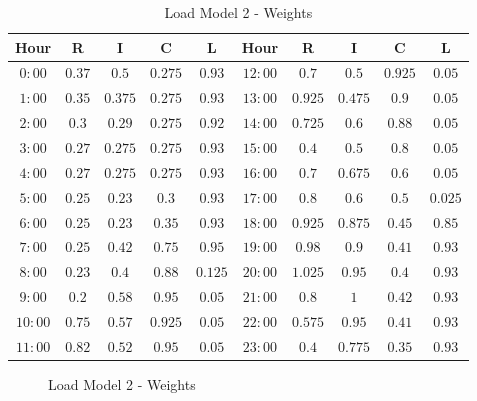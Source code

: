\begin{table}[H]
\centering
\begin{tabular}{ccccc|ccccc}
\rowcolor{gray!25}
\textbf{Hour} & \textbf{R} & \textbf{I} & \textbf{C} & \textbf{L} & \textbf{Hour} & \textbf{R} & \textbf{I} & \textbf{C} & \textbf{L}\\
\hline
$0:00$ & $0.37$ & $0.5$ & $0.275$ & $0.93$ & $12:00$ & $0.7$ & $0.5$ & $0.925$ & $0.05$\\
\rowcolor{gray!15}
$1:00$ & $0.35$ & $0.375$ & $0.275$ & $0.93$ & $13:00$ & $0.925$ & $0.475$ & $0.9$ & $0.05$\\
$2:00$ & $0.3$ & $0.29$ & $0.275$ & $0.92$ & $14:00$ & $0.725$ & $0.6$ & $0.88$ & $0.05$\\
\rowcolor{gray!15}
$3:00$ & $0.27$ & $0.275$ & $0.275$ & $0.93$ & $15:00$ & $0.4$ & $0.5$ & $0.8$ & $0.05$\\
$4:00$ & $0.27$ & $0.275$ & $0.275$ & $0.93$ & $16:00$ & $0.7$ & $0.675$ & $0.6$ & $0.05$\\
\rowcolor{gray!15}
$5:00$ & $0.25$ & $0.23$ & $0.3$ & $0.93$ & $17:00$ & $0.8$ & $0.6$ & $0.5$ & $0.025$\\
$6:00$ & $0.25$ & $0.23$ & $0.35$ & $0.93$ & $18:00$ & $0.925$ & $0.875$ & $0.45$ & $0.85$\\
\rowcolor{gray!15}
$7:00$ & $0.25$ & $0.42$ & $0.75$ & $0.95$ & $19:00$ & $0.98$ & $0.9$ & $0.41$ & $0.93$\\
$8:00$ & $0.23$ & $0.4$ & $0.88$ & $0.125$ & $20:00$ & $1.025$ & $0.95$ & $0.4$ & $0.93$\\
\rowcolor{gray!15}
$9:00$ & $0.2$ & $0.58$ & $0.95$ & $0.05$ & $21:00$ & $0.8$ & $1$ & $0.42$ & $0.93$\\
$10:00$ & $0.75$ & $0.57$ & $0.925$ & $0.05$ & $22:00$ & $0.575$ & $0.95$ & $0.41$ & $0.93$\\
\rowcolor{gray!15}
$11:00$ & $0.82$ & $0.52$ & $0.95$ & $0.05$ & $23:00$ & $0.4$ & $0.775$ & $0.35$ & $0.93$\\
\hline
\end{tabular}
\caption{Load Model 2 - Weights}
\end{table}

\begin{figure}[H]
\centering
\setlength\figureheight{4cm}
\setlength\figurewidth{10cm}

\caption{Load Model 2 - Weights}
\end{figure}

